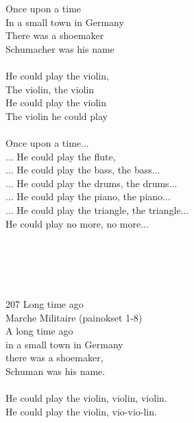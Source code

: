 
            Once upon a time \\
            In a small town in Germany \\
            There was a shoemaker \\
            Schumacher was his name \\
\hspace{10mm} \\
            He could play the violin, \\
            The violin, the violin \\
            He could play the violin \\
            The violin he could play \\
\hspace{10mm} \\
            Once upon a time... \\
            ... He could play the flute, \\
            ... He could play the bass, the bass... \\
            ... He could play the drums, the drums... \\
            ... He could play the piano, the piano... \\
            ... He could play the triangle, the triangle... \\
            He could play no more, no more... \\
\hspace{10mm} \\
 \\
\hspace{10mm} \\
 \\
\hspace{10mm} \\
207 Long time ago \\
Marche Militaire (painokset 1-8) \\
            A long time ago  \\
            in a small town in Germany  \\
            there was a shoemaker, \\
            Schuman was his name. \\
\hspace{10mm} \\
            He could play the violin, violin, violin.  \\
            He could play the violin, vio-vio-lin.  \\
